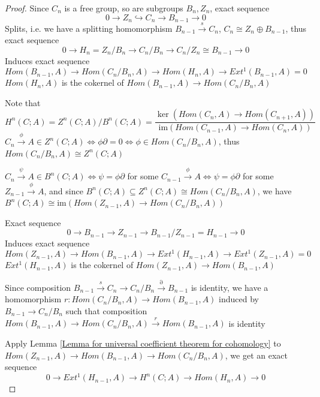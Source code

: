 \documentclass[main]{subfiles}
\begin{document}
\begin{proof}
Since $C_n$ is a free group, so are subgroups $B_n,Z_n$, exact sequence
\[0\to Z_n\hookrightarrow C_n\to B_{n-1}\to0\]
Splits, i.e. we have a splitting homomorphism $B_{n-1}\xrightarrow{s}C_n$, $C_n\cong Z_n\oplus B_{n-1}$, thus exact sequence
\[0\to H_n=Z_n/B_n\to C_n/B_n\to C_n/Z_n\cong B_{n-1}\to0\]
Induces exact sequence
\[Hom(B_{n-1},A)\to Hom(C_n/B_n,A)\to Hom(H_n,A)\to Ext^1(B_{n-1},A)=0\]
$Hom(H_n,A)$ is the cokernel of $Hom(B_{n-1},A)\to Hom(C_n/B_n,A)$ \par
Note that
\[H^n(C;A)=Z^n(C;A)/B^n(C;A)=\dfrac{\ker(Hom(C_n,A)\to Hom(C_{n+1},A))}{\mathrm{im}(Hom(C_{n-1},A)\to Hom(C_n,A))}\]
$C_n\xrightarrow{\phi} A\in Z^n(C;A)\Leftrightarrow\phi\partial=0\Leftrightarrow\phi\in Hom(C_n/B_n,A)$, thus $Hom(C_n/B_n,A)\cong Z^n(C;A)$
\begin{center}
\end{center}
$C_n\xrightarrow{\psi} A\in B^n(C;A)\Leftrightarrow\psi=\phi\partial$ for some $C_{n-1}\xrightarrow{\phi} A\Leftrightarrow\psi=\phi\partial$ for some $Z_{n-1}\xrightarrow{\phi} A$, and since $B^n(C;A)\subseteq Z^n(C;A)\cong Hom(C_n/B_n,A)$, we have $B^n(C;A)\cong\mathrm{im}(Hom(Z_{n-1},A)\to Hom(C_n/B_n,A))$
\begin{center}
\end{center}
Exact sequence
\[0\to B_{n-1}\to Z_{n-1}\to B_{n-1}/Z_{n-1}=H_{n-1}\to0\]
Induces exact sequence
\[Hom(Z_{n-1},A)\to Hom(B_{n-1},A)\to Ext^1(H_{n-1},A)\to Ext^1(Z_{n-1},A)=0\]
$Ext^1(H_{n-1},A)$ is the cokernel of $Hom(Z_{n-1},A)\to Hom(B_{n-1},A)$ \par
Since composition $B_{n-1}\xrightarrow{s}C_n\to C_n/B_n\xrightarrow{\partial}B_{n-1}$ is identity, we have a homomorphism $r:Hom(C_n/B_n,A)\to Hom(B_{n-1},A)$ induced by $B_{n-1}\to C_n/B_n$ such that composition $Hom(B_{n-1},A)\to Hom(C_n/B_n,A)\xrightarrow{r} Hom(B_{n-1},A)$ is identity \par
Apply Lemma \ref{Lemma for universal coefficient theorem for cohomology} to $Hom(Z_{n-1},A)\to Hom(B_{n-1},A)\to Hom(C_n/B_n,A)$, we get an exact sequence
\[0\to Ext^1(H_{n-1},A)\to H^n(C;A)\to Hom(H_n,A)\to0\]
\end{proof}
\end{document}
